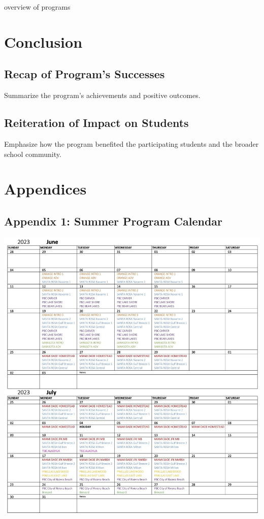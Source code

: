 \documentclass[
]{article}
\begin{document}
overview of programs

\hypertarget{conclusion}{%
\section{Conclusion}\label{conclusion}}

\hypertarget{recap-of-programs-successes}{%
\subsection{Recap of Program's
Successes}\label{recap-of-programs-successes}}

Summarize the program's achievements and positive outcomes.

\hypertarget{reiteration-of-impact-on-students}{%
\subsection{Reiteration of Impact on
Students}\label{reiteration-of-impact-on-students}}

Emphasize how the program benefited the participating students and the
broader school community.

\pagebreak

\hypertarget{appendices}{%
\section{Appendices}\label{appendices}}

\hypertarget{appendix-1-summer-program-calendar}{%
\subsection{Appendix 1: Summer Program
Calendar}\label{appendix-1-summer-program-calendar}}

\includegraphics[width=1\textwidth,height=\textheight]{Images/GGEE_23_Calendar.jpg}
\end{document}
